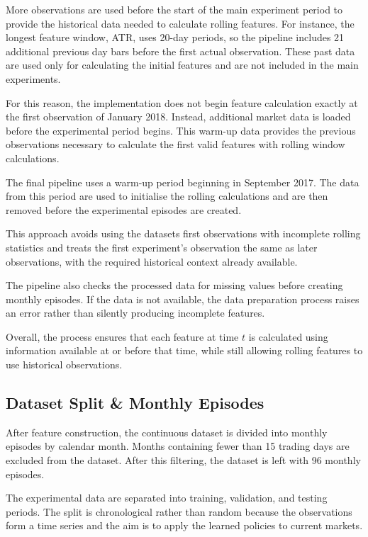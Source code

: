 More observations are used before the start of the main experiment
period to provide the historical data needed to calculate rolling
features. For instance, the longest feature window, ATR, uses 20-day
periods, so the pipeline includes 21 additional previous day bars before
the first actual observation. These past data are used only for
calculating the initial features and are not included in the main
experiments.

For this reason, the implementation does not begin feature calculation
exactly at the first observation of January 2018. Instead, additional
market data is loaded before the experimental period begins. This
warm-up data provides the previous observations necessary to calculate
the first valid features with rolling window calculations.

The final pipeline uses a warm-up period beginning in September 2017.
The data from this period are used to initialise the rolling
calculations and are then removed before the experimental episodes are
created.

This approach avoids using the dataset\textquotesingle s first
observations with incomplete rolling statistics and treats the first
experiment's observation the same as later observations, with the
required historical context already available.

The pipeline also checks the processed data for missing values before
creating monthly episodes. If the data is not available, the data
preparation process raises an error rather than silently producing
incomplete features.

Overall, the process ensures that each feature at time \(t\) is
calculated using information available at or before that time, while
still allowing rolling features to use historical observations.

\subsection{Dataset Split \& Monthly Episodes}

After feature construction, the continuous dataset is divided into
monthly episodes by calendar month. Months containing fewer than 15
trading days are excluded from the dataset. After this filtering, the
dataset is left with 96 monthly episodes.

The experimental data are separated into training, validation, and
testing periods. The split is chronological rather than random because
the observations form a time series and the aim is to apply the learned
policies to current markets.

